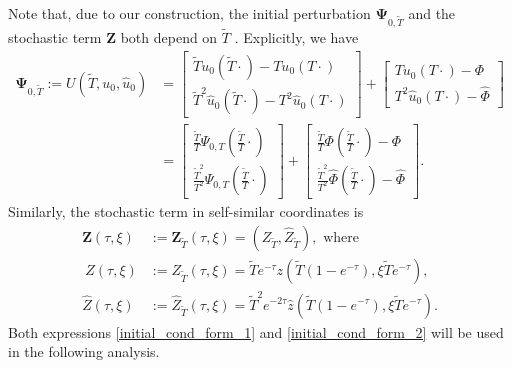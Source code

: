 \documentclass[12pt,reqno]{amsart}
\theoremstyle{plain}
\theoremstyle{remark}
\theoremstyle{plain}
\theoremstyle{definition}
\numberwithin{equation}{section}
\numberwithin{equation}{section}
\begin{document}
    Note that, due to our construction, the initial perturbation $\mathbf{\Psi}_{0,\tilde{T}}$
  and the stochastic term $\mathbf{Z}$ both depend on $\tilde{T}$
 . Explicitly, we have
	\begin{align}
\mathbf{\Psi}_{0,\tilde{T}}:=U(\tilde{T}, u_0, \hat{u}_0)&=\begin{bmatrix}
			\tilde{T} u_0(\tilde{T} \cdot)-{T} u_0({T} \cdot)\\
			\tilde{T}^2 \hat{u}_0(\tilde{T} \cdot)-{T}^2 \hat{u}_0({T} \cdot)
		\end{bmatrix}+\begin{bmatrix}
			{T} u_0({T} \cdot)-\Phi\\
			{T}^2 \hat{u}_0({T} \cdot)-\hat{\Phi}
		\end{bmatrix}\label{initial_cond_form_1}\\ & =\begin{bmatrix}
			\frac{\tilde{T}}{T} \Psi_{0,T}(\frac{\tilde{T}}{T} \cdot)\\
			\frac{\tilde{T}^2}{T^2} \hat{\Psi}_{0,T}(\frac{\tilde{T}}{T} \cdot)
		\end{bmatrix}+\begin{bmatrix}
			\frac{\tilde{T}}{T} \Phi(\frac{\tilde{T}}{T} \cdot)-\Phi\\
			\frac{\tilde{T}^2}{T^2} \hat{\Phi}(\frac{\tilde{T}}{T} \cdot)-\hat{\Phi}
		\end{bmatrix}.\label{initial_cond_form_2}
	\end{align}
    Similarly, the stochastic term in self-similar coordinates is
    \begin{align*}
		\mathbf{Z}(\tau,\xi)&:=\mathbf{Z}_{\tilde{T}}(\tau, \xi)=(Z_{\tilde{T}},\hat{Z}_{\tilde{T}}), \text{ where }\\ \
		Z(\tau, \xi)&:=Z_{\tilde{T}}(\tau, \xi)=\tilde{T} e^{-\tau}z(\tilde{T}(1-e^{-\tau}), \xi \tilde{T} e^{-\tau}),\\
		\hat{Z}(\tau, \xi)&:=\hat{Z}_{\tilde{T}}(\tau, \xi)=\tilde{T}^2 e^{-2\tau}\hat{z}(\tilde{T}(1-e^{-\tau}), \xi \tilde{T} e^{-\tau}).
	\end{align*}
	Both expressions \eqref{initial_cond_form_1} and \eqref{initial_cond_form_2} will be used in the following analysis.
	
\end{document}
